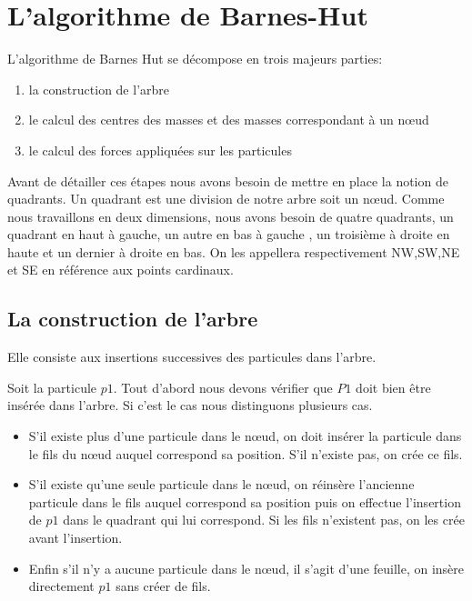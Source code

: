 \section{L'algorithme de Barnes-Hut}
L'algorithme de Barnes Hut se décompose en trois majeurs parties:

\begin{enumerate}
\item la construction de l'arbre

\item le calcul des centres des masses et des masses correspondant à un nœud

\item le calcul des forces appliquées sur les particules
\end{enumerate}


Avant de détailler ces étapes nous avons besoin de mettre en place la notion de quadrants. Un quadrant est une division de notre arbre soit un nœud. Comme nous travaillons en deux dimensions, nous avons besoin de quatre quadrants, un quadrant en haut à gauche, un autre en bas à gauche , un troisième à droite en haute et un dernier à droite en bas. On les appellera respectivement NW,SW,NE et SE en référence aux points cardinaux.

\subsection{La construction de l'arbre}

Elle consiste aux insertions successives des particules dans l'arbre.

Soit la particule $p1$. Tout d'abord nous devons vérifier que $P1$ doit bien être insérée dans l'arbre.
Si c'est le cas nous distinguons plusieurs cas. 
\begin{itemize}

\item S'il existe plus d'une particule dans le nœud, on doit insérer la particule dans le fils du nœud auquel correspond sa position. S'il n'existe pas, on crée ce fils.


\item S'il existe qu'une seule particule dans le nœud, on réinsère l'ancienne particule dans le fils auquel correspond sa position puis on effectue l'insertion de $p1$ dans le quadrant qui lui correspond. Si les fils n'existent pas, on les crée avant l'insertion. 

\item Enfin s'il n'y a aucune particule dans le nœud, il s'agit  d'une feuille, on insère directement $p1$ sans créer de fils.

\end{itemize}

